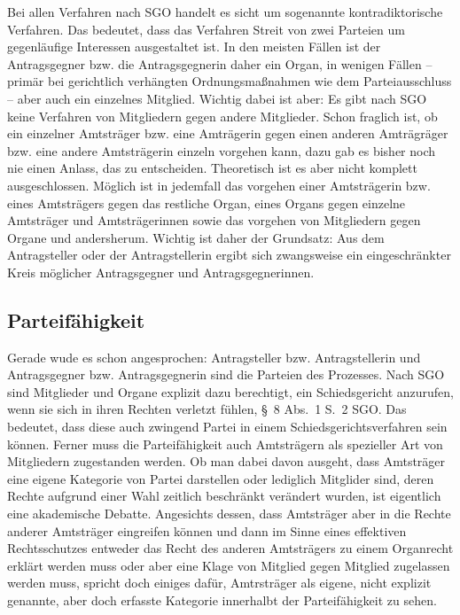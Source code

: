 Bei allen Verfahren nach SGO handelt es sicht um sogenannte kontradiktorische Verfahren.
Das bedeutet, dass das Verfahren Streit von zwei Parteien um gegenläufige Interessen ausgestaltet ist.
In den meisten Fällen ist der Antragsgegner bzw. die Antragsgegnerin daher ein Organ, in wenigen Fällen -- primär bei gerichtlich verhängten Ordnungsmaßnahmen wie dem Parteiausschluss -- aber auch ein einzelnes Mitglied.
Wichtig dabei ist aber: Es gibt nach SGO keine Verfahren von Mitgliedern gegen andere Mitglieder.
Schon fraglich ist, ob ein einzelner Amtsträger bzw. eine Amträgerin gegen einen anderen Amträgräger bzw. eine andere
Amtsträgerin einzeln vorgehen kann, dazu gab es bisher noch nie einen Anlass, das zu entscheiden.
Theoretisch ist es aber nicht komplett ausgeschlossen.
Möglich ist in jedemfall das vorgehen einer Amtsträgerin bzw. eines Amtsträgers gegen das restliche Organ, eines Organs  gegen einzelne Amtsträger und Amtsträgerinnen sowie das vorgehen von Mitgliedern gegen Organe und andersherum.
Wichtig ist daher der Grundsatz: Aus dem Antragsteller oder der Antragstellerin ergibt sich zwangsweise ein eingeschränkter Kreis möglicher Antragsgegner und Antragsgegnerinnen.

\subsection{Parteifähigkeit}
\label{Standardworkflow:Parteifaehigkeit}
Gerade wude es schon angesprochen: Antragsteller bzw. Antragstellerin und Antragsgegner bzw. Antragsgegnerin sind die Parteien des Prozesses.
Nach SGO sind Mitglieder und Organe explizit dazu berechtigt, ein Schiedsgericht anzurufen, wenn sie sich in ihren Rechten verletzt fühlen, \S~8 Abs.~1 S.~2 SGO.
Das bedeutet, dass diese auch zwingend Partei in einem Schiedsgerichtsverfahren sein können.
Ferner muss die Parteifähigkeit auch Amtsträgern als spezieller Art von Mitgliedern zugestanden werden.
Ob man dabei davon ausgeht, dass Amtsträger eine eigene Kategorie von Partei darstellen oder lediglich Mitglider sind, deren Rechte aufgrund einer Wahl zeitlich beschränkt verändert wurden, ist eigentlich eine akademische Debatte.
Angesichts dessen, dass Amtsträger aber in die Rechte anderer Amtsträger eingreifen können und dann im Sinne eines effektiven Rechtsschutzes entweder das Recht des anderen Amtsträgers zu einem Organrecht erklärt werden muss oder aber eine Klage von Mitglied gegen Mitglied zugelassen werden muss, spricht doch einiges dafür, Amtrsträger als eigene, nicht explizit genannte,  aber doch erfasste Kategorie innerhalbt der Parteifähigkeit zu sehen.

